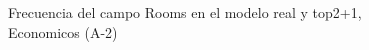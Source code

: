 \begin{figure}[H]
    \centering
    
    \caption{Frecuencia del campo Rooms en el modelo real y top2+1, Economicos (A-2)}
    \label{frecuency-Rooms-top2+1}
\end{figure}